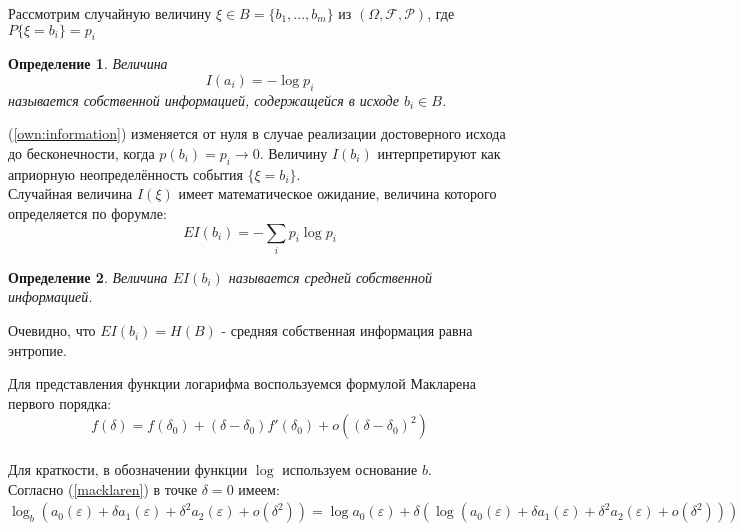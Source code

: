 \documentclass[a4paper,12pt]{article}
\theoremstyle{plain}
\newtheorem{definition}{Определение}[section]
\begin{document}
Рассмотрим случайную величину $\xi\in B=\{b_1,...,b_m\}$ из $(\Omega,\mathcal{F},\mathcal{P} )$, где $P\{\xi=b_i\}=p_i$\\
\begin{definition} \cite{duhin} 
Величина 
\begin{equation}\label{own:information}I(a_i)=-\log p_i
\end{equation}
 называется собственной информацией, содержащейся в исходе $b_i \in B$. 
\end{definition}
(\ref{own:information}) изменяется от нуля в случае
реализации достоверного исхода до бесконечности, когда $p(b_i)=p_i\rightarrow 0$.
Величину $I(b_i)$ интерпретируют как априорную неопределённость события $\{\xi=b_i\}$.\\
Случайная величина $I(\xi)$ имеет математическое ожидание, величина которого определяется по форумле:
\begin{equation}
EI(b_i)=-\sum_{i}p_i\log p_i
\end{equation}
\begin{definition}\cite{duhin}
	Величина $EI(b_i)$ называется средней собственной информацией.
\end{definition}
Очевидно, что $EI(b_i)=H(B)$ - средняя собственная информация равна энтропие.

Для представления функции логарифма воспользуемся формулой Макларена первого порядка:
\begin{equation}\label{macklaren}
f(\delta)=f(\delta_0)+(\delta-\delta_0)f'(\delta_0)+o((\delta-\delta_0)^2)
\end{equation}\\
Для краткости, в обозначении функции $\log$ используем основание $b$. \\
Согласно (\ref{macklaren}) в точке $\delta=0$ имеем:\\
$\log_b(a_0(\varepsilon)+\delta a_1(\varepsilon) + \delta^2 a_2(\varepsilon) + o(\delta^2)) = \log a_0(\varepsilon)+\delta (\log(a_0(\varepsilon)+\delta a_1(\varepsilon) + \delta^2 a_2(\varepsilon) + o(\delta^2)))'|_{\delta=0} = 
\log a_0(\varepsilon) +\delta (\frac{1}{\ln b}\cdot\frac{a_1(\varepsilon)}{a_0(\varepsilon)})+o(\delta^2).$
\end{document}
